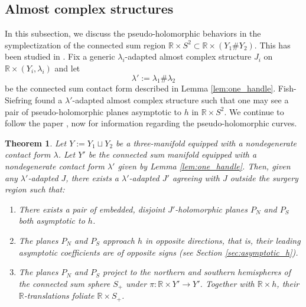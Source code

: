 \documentclass{article}
\numberwithin{equation}{section}
\newtheorem{theorem}{Theorem}[section]
\theoremstyle{definition}
\newcommand{\R}{\mathbb{R}}
\begin{document}
\subsection{Almost complex structures}
\label{sec:almost_complex_structures}
In this subsection, we discuss the pseudo-holomorphic behaviors in the symplectization of the connected sum region $\mathbb{R} \times S^2 \subset \mathbb{R} \times (Y_1 \# Y_2)$. This has been studied in \cite{232,Fish_Siefring}. Fix a generic $\lambda_i$-adapted almost complex structure $J_i$ on $\R \times (Y_i,\lambda_i)$ and let 
$$\lambda':=\lambda_1 \# \lambda_2$$ 
be the connected sum contact form described in Lemma \ref{lem:one_handle}. Fish-Siefring found a $\lambda'$-adapted almost complex structure such that one may see a pair of pseudo-holomorphic planes asymptotic to $h$ in $\mathbb{R} \times S^2$. We continue to follow the paper \cite{Fish_Siefring}, now for information regarding the pseudo-holomorphic curves. 

\begin{theorem}\cite[Theorem 5.1]{Fish_Siefring}
\label{thm:Fish_Siefring}
Let $Y:=Y_1\sqcup Y_2$ be a three-manifold equipped with a nondegenerate contact form $\lambda$. Let $Y'$ be the connected sum manifold equipped with a nondegenerate contact form $\lambda'$ given by Lemma \ref{lem:one_handle}. Then, given any $\lambda'$-adapted $J$, there exists a $\lambda'$-adapted $J'$ agreeing with $J$ outside the surgery region such that:
\begin{enumerate}
    \item There exists a pair of embedded, disjoint $J'$-holomorphic planes $P_N$ and $P_S$ both asymptotic to $h$. 
    \item The planes $P_N$ and $P_S$ approach $h$ in \emph{opposite directions}, that is, their leading asymptotic coefficients are of opposite signs (see Section \ref{sec:asymptotic_h}).
    \item The planes $P_N$ and $P_S$ project to the northern and southern hemispheres of the connected sum sphere $S_+$ under $\pi: \R\times Y' \to Y'$. Together with $\R \times h$, their $\R$-translations foliate $\R \times S_+$.
\end{enumerate}
\end{theorem}
\end{document}
